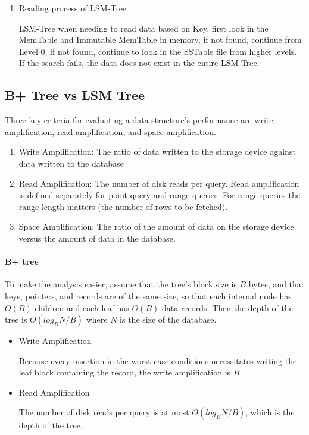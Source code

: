 \begin{enumerate}
\item Reading process of LSM-Tree

LSM-Tree when needing to read data based on Key, first look in the MemTable and Immutable MemTable in memory, if not found, continue from Level 0, if not found, continue to look in the SSTable file from higher levels\cite{lsm_tree}. If the search fails, the data does not exist in the entire LSM-Tree.

\end{enumerate}

\subsection{B+ Tree vs LSM Tree}

Three key criteria for evaluating a data structure's performance are write amplification, read amplification, and space amplification\cite{tikv}.

\begin{enumerate}
    \item Write Amplification: The ratio of data written to the storage device against data written to the database
    
    \item Read Amplification: The number of disk reads per query. Read amplification is defined separately for point query and range queries. For range queries the range length matters (the number of rows to be fetched)\cite{tikv}.
    
    \item Space Amplification: The ratio of the amount of data on the storage device versus the amount of data in the database\cite{tikv}.
\end{enumerate}

\paragraph{B+ tree}
To make the analysis easier, assume that the tree's block size is $B$ bytes, and that keys, pointers, and records are of the same size, so that each internal node has $O(B)$ children and each leaf has $O(B)$ data records. Then the depth of the tree is $O(log_B N/B)$ where $N$ is the size of the database\cite{tikv}.

\begin{itemize}
    \item Write Amplification
    
    Because every insertion in the worst-case conditions necessitates writing the leaf block containing the record, the write amplification is $B$.
    
    \item Read Amplification
    
    The number of disk reads per query is at most $O(log_B N/B)$, which is the depth of the tree.
\end{itemize}


